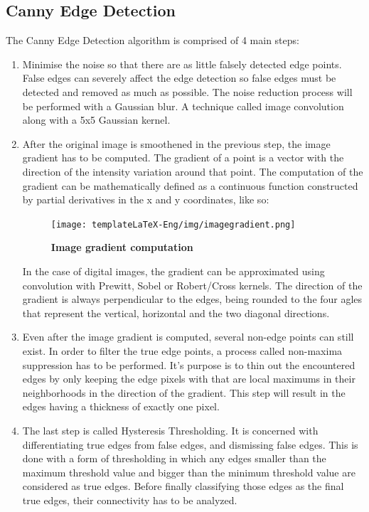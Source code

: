 \documentclass[12pt,a4paper,twoside]{report}
\begin{document}
\subsection{Canny Edge Detection}
The Canny Edge Detection algorithm is comprised of 4 main steps:
\begin{enumerate}
    \item Minimise the noise so that there are as little falsely detected edge points. False edges can severely affect the edge detection so false edges must be detected and removed as much as possible. The noise reduction process will be performed with a Gaussian blur. A technique called image convolution along with a 5x5 Gaussian kernel. 
    \item After the original image is smoothened in the previous step, the image gradient has to be computed. The gradient of a point is a vector with the direction of the intensity variation around that point. The computation of the gradient can be mathematically defined as a continuous function constructed by partial derivatives in the x and y coordinates, like so:
    \begin{figure}[H]
        \begin{center}
            \texttt{[image: templateLaTeX-Eng/img/imagegradient.png]}
            \caption{\bf Image gradient computation\footnotemark}
        \end{center}
    \end{figure}
    In the case of digital images, the gradient can be approximated using convolution with Prewitt, Sobel or Robert/Cross kernels. 
    The direction of the gradient is always perpendicular to the edges, being rounded to the four agles that represent the vertical, horizontal and the two diagonal directions.
    \item Even after the image gradient is computed, several non-edge points can still exist. In order to filter the true edge points, a process called non-maxima suppression has to be performed. It's purpose is to thin out the encountered edges by only keeping the edge pixels with that are local maximums in their neighborhoods in the direction of the gradient. This step will result in the edges having a thickness of exactly one pixel.
    \item The last step is called Hysteresis Thresholding. It is concerned with differentiating true edges from false edges, and dismissing false edges. This is done with a form of thresholding in which any edges smaller than the maximum threshold value and bigger than the minimum threshold value are considered as true edges. Before finally classifying those edges as the final true edges, their connectivity has to be analyzed. 
\end{enumerate}
\end{document}
